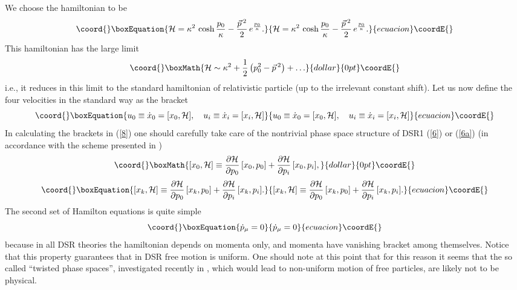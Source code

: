 \documentclass  [12pt] {article}
\providecommand{\dd}[2]{\frac{\partial #1}{\partial #2}}
\begin{document}
We choose the hamiltonian to be
\begin{equation}\coord{}\boxEquation{\label{7} { \cal H} =
\kappa^2\, \cosh \frac{p_0}\kappa  - \frac{\vec{p}\,{}^2}{2} \, e^{
\frac{p_0}\kappa}.
}{{ \cal H} =
\kappa^2\, \cosh \frac{p_0}\kappa  - \frac{\vec{p}\,{}^2}{2} \, e^{
\frac{p_0}\kappa}.
}{ecuacion}\coordE{}\end{equation}
This hamiltonian has the large \myHighlight{$\kappa$}\coordHE{} limit
$$\coord{}\boxMath{
{ \cal H} \sim \kappa^2 +\frac12\left(p^2_0 -\vec{p}\,{}^2\right) + \ldots
}{dollar}{0pt}\coordE{}$$
i.e., it reduces in this limit to the standard hamiltonian of relativistic
particle (up to the irrelevant constant shift). Let us now define the four
velocities in the standard way as the bracket
\begin{equation}\coord{}\boxEquation{\label{8}
 u_0 \equiv  \dot x_0 =  [x_0,{\cal H}], \quad u_i \equiv  \dot x_i =  [x_i,{\cal H}]
}{u_0 \equiv  \dot x_0 =  [x_0,{\cal H}], \quad u_i \equiv  \dot x_i =  [x_i,{\cal H}]
}{ecuacion}\coordE{}\end{equation}
In calculating the brackets in (\ref{8}) one should carefully take care of the
nontrivial phase space structure of DSR1 (\ref{6}) or (\ref{6a}) (in accordance
with the scheme presented in \cite{Lukierski:1993wx})
$$\coord{}\boxMath{
  [x_0,{\cal H}] \equiv \dd{{\cal H}}{p_0}\, [x_0, p_0] + \dd{{\cal H}}{p_i}\, [x_0,
  p_i],
  }{dollar}{0pt}\coordE{}$$
  \begin{equation}\coord{}\boxEquation{\label{9} [x_k,{\cal H}] \equiv \dd{{\cal H}}{p_0}\, [x_k, p_0] + \dd{{\cal H}}{p_i}\, [x_k,
  p_i].
}{[x_k,{\cal H}] \equiv \dd{{\cal H}}{p_0}\, [x_k, p_0] + \dd{{\cal H}}{p_i}\, [x_k,
  p_i].
}{ecuacion}\coordE{}\end{equation}
The second set of Hamilton equations is quite simple
\begin{equation}\coord{}\boxEquation{\label{10}
\dot p_\mu =0
}{\dot p_\mu =0
}{ecuacion}\coordE{}\end{equation}
because in all DSR theories the hamiltonian depends on momenta only, and
momenta have vanishing bracket among themselves. Notice that this property
guarantees that in DSR free motion is uniform. One should note at this point
that for this reason it seems that the so called ``twisted phase spaces'',
investigated recently in \cite{czerhoniak2003}, which would lead to non-uniform
motion of free particles, are likely not to be physical.
\end{document}

